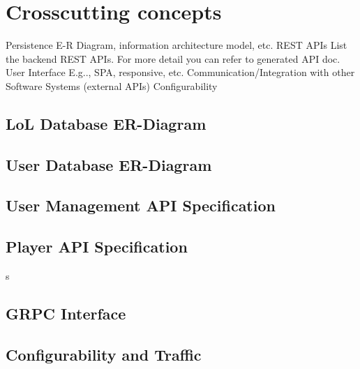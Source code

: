 \section{Crosscutting concepts}
Persistence 
E-R Diagram, information architecture model, etc.
REST APIs
List the backend REST APIs. For more detail you can refer to generated API doc.
User Interface
E.g.., SPA, responsive, etc.
Communication/Integration with other Software Systems (external APIs)
Configurability

\subsection{LoL Database ER-Diagram}

\subsection{User Database ER-Diagram}

\subsection{User Management API Specification}

\subsection{Player API Specification}s

\subsection{GRPC Interface}

\subsection{Configurability and Traffic}